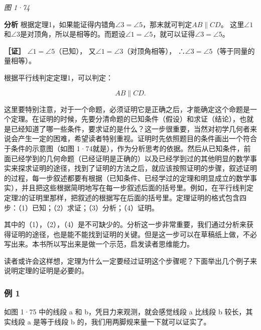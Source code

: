 \emph{图 1·74}

\textbf{分析}
根据定理1，如果能证得内错角\(\angle 3 = \angle 5\)，那末就可判定\(AB \parallel CD\)。
这里\(\angle 1\)和\(\angle 3\)是对顶角，所以是相等的。而题设\(\angle 1 = \angle 5\)，就可以证得\(\angle 3 = \angle 5\)。

\textbf{［证］} \(\angle 1 = \angle 5\)（已知），
又\(\angle 1 = \angle 3\)（对顶角相等），
∴\(\angle3=\angle5\)（等于同量的量相等）。

根据平行线判定定理1，可以判定：

\[
AB \parallel CD.
\]

这里要特别注意，对于一个命题，必须证明它是正确之后，才能确定这个命题是一个定理。在证明的时候，先要分清命题的已知条件（假设）和求证（结论），也就是已经知道了哪一些条件，要求证的是什么？这一步很重要，当然对初学几何者来说会产生一定的困难，希望读者特别重视。证明时先依照题目的条件画出一个符合于条件的示意图（如图
1·74就是），作为分析思考的依据。然后从已知条件，前面已经学到的几何命题（已经证明是正确的）以及已经学到过的其他明显的数学事实来探求证明的途径，找到了证明的方法之后，就应该按照证明的步骤，叙述证明的过程，每一步叙述都要有根据（已知条件、已经学过的定理和明显成立的数学事实），并且把这些根据简明地写在每一步叙述后面的括号里。例如，在平行线判定定理2的证明里那样，把叙述的根据写在后面的括号里。定理证明的格式包含四步：（1）已知；（2）求证；（3）分析；（4）证明。

其中的（1），（2），（4）是不可缺少的。分析这一步非常重要，我们通过分析来获得证明的途径，也是能不能找到证明的关键。但是这一步可以在草稿纸上做，不必写出来。本书所以写出来是做一个示范，启发读者思维能力。

读者或许会这样想，定理为什么一定要经过证明这个步骤呢？下面举出几个例子来说明定理的证明是必要的。

\subsubsection{例 1}

如图 1·75 中的线段 a 和 b，凭目力来观测，就会感觉线段 a 比线段 b
较长，其实线段 a 是等于线段 b 的，我们用两脚规来量一下就可以证实了。

